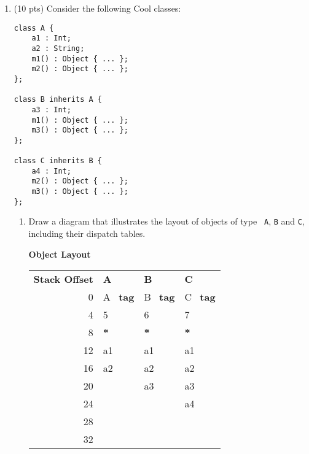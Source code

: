 \documentclass[10pt]{article}
\begin{document}
\begin{enumerate}

\item (10 pts)
Consider the following Cool classes:

\begin{center}
\begin{minipage}{6cm}
\begin{verbatim}
class A {
    a1 : Int;
    a2 : String;
    m1() : Object { ... };
    m2() : Object { ... };
};

class B inherits A {
    a3 : Int;
    m1() : Object { ... };
    m3() : Object { ... };
};

class C inherits B {
    a4 : Int;
    m2() : Object { ... };
    m3() : Object { ... };
};
\end{verbatim}
\end{minipage}
\end{center}
\begin{enumerate}

\item Draw a diagram that illustrates the layout of objects of type {\tt
A}, {\tt B} and {\tt C}, including their dispatch tables.
\begin{center}\textbf{Object Layout}\end{center}
\begin{center}\begin{tabular}{r|l|l|l}
  \textbf{Stack Offset} & \textbf{A} & \textbf{B} & \textbf{C}\\
  0 &  A \ \textbf{tag}  & B \ \textbf{tag}  & C \ \textbf{tag} \\
  4 & 5 & 6 & 7\\
  8 & \textbf{*} & \textbf{*} & \textbf{*} \\
  12 & a1 & a1 &a1\\
  16 & a2 & a2 & a2 \\
  20 &  & a3 &a3\\
  24 &  &  & a4 \\
  28 &  &  &\\
  32 &  &  &\\
  \end{tabular}\end{center}



\end{enumerate}
\end{enumerate}
\end{document}
